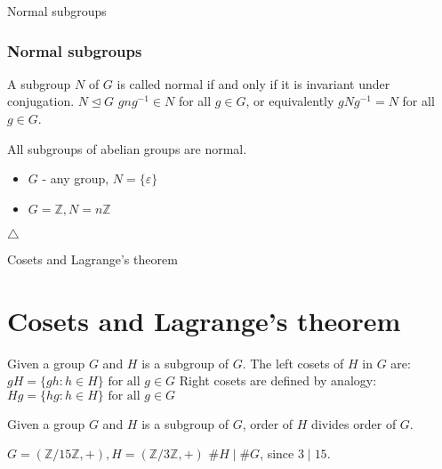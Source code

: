 \documentclass{beamer}
\begin{document}
\begin{frame}{Normal subgroups}
	\subsubsection*{Normal subgroups}
	\begin{definition}
		A subgroup $N$ of $G$ is called normal if and only if it is invariant under conjugation. \newline
		$N \unlhd G$ \newline
		$g n g^{-1} \in N$ for all $g \in G$, or equivalently \newline 
		$g N g^{-1} = N$ for all $g \in G$.
	\end{definition}
	\begin{prop}
		All subgroups of abelian groups are normal.
	\end{prop}
	\begin{example}
		\begin{itemize}
			\item $G$ - any group, $N = \{\varepsilon\}$
			\item $G = \mathbb{Z}, N = n\mathbb{Z}$
		\end{itemize}
	\end{example}
	$\triangle$
\end{frame}


\begin{frame}{Cosets and Lagrange's theorem}
	\section{Cosets and Lagrange's theorem}

	\begin{definition}[Coset]
		Given a group $G$ and $H$ is a subgroup of $G$. The left cosets of $H$ in $G$ are: \newline
		$gH = \{gh : h \in H\} \text{ for all } g \in G$ \newline
		Right cosets are defined by analogy: \newline
		$Hg = \{hg : h \in H\} \text{ for all } g \in G$
	\end{definition}
	
	\begin{theorem}
		Given a group $G$ and $H$ is a subgroup of $G$, order of $H$ divides order of $G$.
	\end{theorem}
	\begin{example}
		$G = (\mathbb{Z} / 15\mathbb{Z}, +), H = (\mathbb{Z} / 3\mathbb{Z}, +)$ \newline
		$\# H \mid \# G$, since $3 \mid 15$. 
	\end{example}
	
\end{frame}
\end{document}
